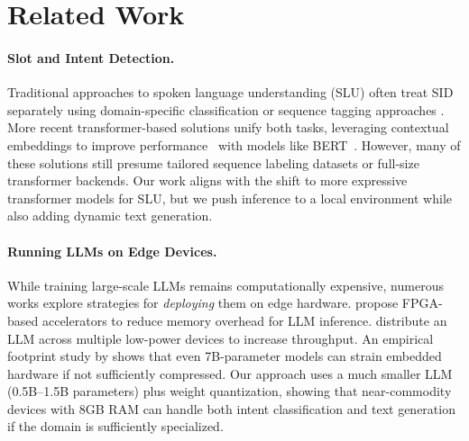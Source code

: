 \section{Related Work}
\paragraph{Slot and Intent Detection.}
Traditional approaches to spoken language understanding (SLU) often treat SID separately using domain-specific classification or sequence tagging approaches \citep{zhang2016joint, wang-etal-2018-bi, weld2022survey, Survey, pham-etal-2023-misca}. More recent transformer-based solutions unify both tasks, leveraging contextual embeddings to improve performance~\citep{castellucci2019multi, van-der-goot-etal-2021-masked, stoica2021intent, arora2024intent} with models like BERT~\citep{devlin-etal-2019-bert}. However, many of these solutions still presume tailored sequence labeling datasets or full-size transformer backends. Our work aligns with the shift to more expressive transformer models for SLU, but we push inference to a local environment while also adding dynamic text generation.

\paragraph{Running LLMs on Edge Devices.}
While training large-scale LLMs remains computationally expensive, numerous works explore strategies for \emph{deploying} them on edge hardware. \citet{arxiv2408} propose FPGA-based accelerators to reduce memory overhead for LLM inference. \citet{EdgeShard} distribute an LLM across multiple low-power devices to increase throughput. An empirical footprint study by \citet{Resource_Footprint} shows that even 7B-parameter models can strain embedded hardware if not sufficiently compressed. Our approach uses a much smaller LLM (0.5B--1.5B parameters) plus weight quantization, showing that near-commodity devices with 8GB RAM can handle both intent classification and text generation if the domain is sufficiently specialized.